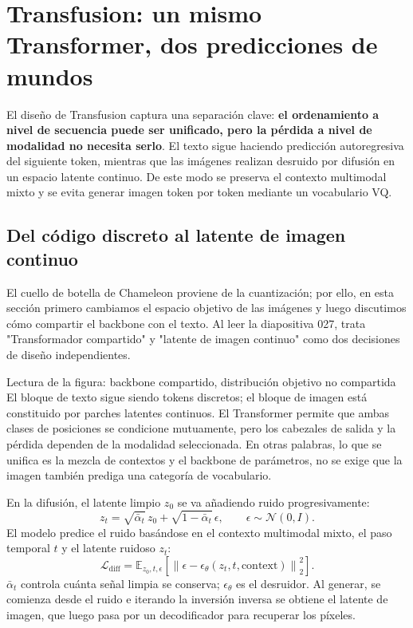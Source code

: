 \section{Transfusion: un mismo Transformer, dos predicciones de mundos}

El diseño de Transfusion captura una separación clave: \textbf{el ordenamiento a nivel de secuencia puede ser unificado, pero la pérdida a nivel de modalidad no necesita serlo}. El texto sigue haciendo predicción autoregresiva del siguiente token, mientras que las imágenes realizan desruido por difusión en un espacio latente continuo. De este modo se preserva el contexto multimodal mixto y se evita generar imagen token por token mediante un vocabulario VQ.

\subsection{Del código discreto al latente de imagen continuo}

El cuello de botella de Chameleon proviene de la cuantización; por ello, en esta sección primero cambiamos el espacio objetivo de las imágenes y luego discutimos cómo compartir el backbone con el texto. Al leer la diapositiva 027, trata "Transformador compartido" y "latente de imagen continuo" como dos decisiones de diseño independientes.


\begin{knowledgebox}{Lectura de la figura: backbone compartido, distribución objetivo no compartida}
El bloque de texto sigue siendo tokens discretos; el bloque de imagen está constituido por parches latentes continuos. El Transformer permite que ambas clases de posiciones se condicione mutuamente, pero los cabezales de salida y la pérdida dependen de la modalidad seleccionada. En otras palabras, lo que se unifica es la mezcla de contextos y el backbone de parámetros, no se exige que la imagen también prediga una categoría de vocabulario.
\end{knowledgebox}

En la difusión, el latente limpio $z_0$ se va añadiendo ruido progresivamente:
$$
z_t=\sqrt{\bar\alpha_t}\,z_0+\sqrt{1-\bar\alpha_t}\,\epsilon,
\qquad \epsilon\sim\mathcal{N}(0,I).
$$
El modelo predice el ruido basándose en el contexto multimodal mixto, el paso temporal $t$ y el latente ruidoso $z_t$:
$$
\mathcal{L}_{\text{diff}}
=\mathbb{E}_{z_0,t,\epsilon}
\left[\left\|\epsilon-\epsilon_\theta(z_t,t,\text{context})\right\|_2^2\right].
$$
$\bar\alpha_t$ controla cuánta señal limpia se conserva; $\epsilon_\theta$ es el desruidor. Al generar, se comienza desde el ruido e iterando la inversión inversa se obtiene el latente de imagen, que luego pasa por un decodificador para recuperar los píxeles.

